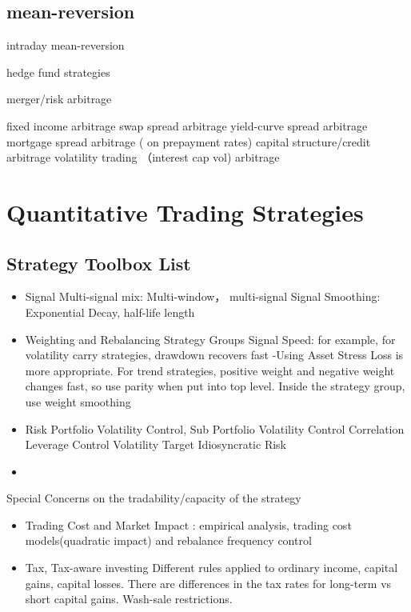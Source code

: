 \documentclass[11pt, openany]{book}              %
\begin{document}
\section{mean-reversion}

intraday mean-reversion

hedge fund strategies

  merger/risk arbitrage

   fixed income arbitrage
       swap spread arbitrage
       yield-curve spread arbitrage
      mortgage spread arbitrage ( on prepayment rates)
      capital structure/credit arbitrage 
      volatility trading （interest cap vol) arbitrage

\chapter{Quantitative Trading Strategies}

\section{Strategy Toolbox List}

\begin{itemize}
	\item Signal
		\subitem Multi-signal mix: Multi-window， multi-signal
		\subitem Signal Smoothing:
			\subsubitem Exponential Decay, half-life length
	\item Weighting and Rebalancing
		\subitem Strategy Groups
		\subitem Signal Speed: for example, for volatility carry strategies, drawdown recovers fast -Using Asset Stress Loss is more appropriate. For trend strategies, positive weight and negative weight changes fast, so use parity when put into top level. Inside the strategy group, use weight smoothing
	\item Risk
		\subitem Portfolio Volatility Control, Sub Portfolio Volatility Control 
		\subitem Correlation
		\subitem Leverage Control
		\subitem Volatility Target
		\subitem Idiosyncratic Risk 
	\item 
\end{itemize}

Special Concerns on the tradability/capacity of the strategy

\begin{itemize}
	\item Trading Cost and Market Impact : empirical analysis, trading cost models(quadratic impact) and rebalance frequency control
	\item Tax, Tax-aware investing
		\subitem Different rules applied to ordinary income, capital gains, capital losses. There are differences in the tax rates for long-term vs short capital gains. Wash-sale restrictions.
\end{itemize}
\end{document}
